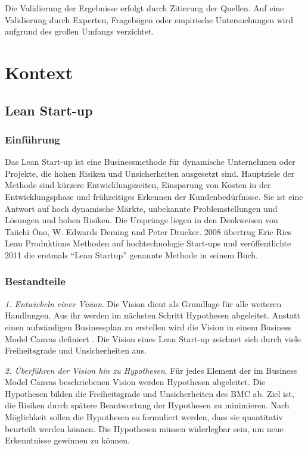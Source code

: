 Die Validierung der Ergebnisse erfolgt durch Zitierung der Quellen. Auf eine Validierung durch Experten, Fragebögen oder empirische Untersuchungen wird aufgrund des großen Umfangs verzichtet. 

\section{Kontext}

\subsection{Lean Start-up}
\subsubsection*{Einführung}
Das Lean Start-up ist eine Businessmethode für dynamische Unternehmen oder Projekte, die hohen Risiken und Unsicherheiten ausgesetzt sind. 
Hauptziele der Methode sind kürzere Entwicklungszeiten, Einsparung von Kosten in der Entwicklungsphase und frühzeitiges Erkennen der Kundenbedürfnisse. 
Sie ist eine Antwort auf hoch dynamische Märkte, unbekannte Problemstellungen und Lösungen und hohen Risiken. Die Ursprünge liegen in den Denkweisen von Taiichi Ōno, W. Edwards Deming und Peter Drucker. 
2008 übertrug Eric Ries Lean Produktions Methoden auf hochtechnologie Start-ups und veröffentlichte 2011 die erstmals ``Lean Startup'' 
genannte Methode in seinem Buch. %


\subsubsection*{Bestandteile}

\textit{1. Entwickeln einer Vision}. Die Vision dient als Grundlage für alle weiteren Handlungen. Aus ihr werden im nächsten Schritt Hypothesen abgeleitet. Anstatt einen aufwändigen Businessplan zu erstellen wird die Vision in einem Business Model Canvas definiert \cite{Blank2013}. Die Vision eines Lean Start-up zeichnet sich durch viele Freiheitsgrade und Unsicherheiten aus. 

\textit{2. Überführen der Vision hin zu Hypothesen}. Für jedes Element der im Business Model Canvas beschriebenen Vision werden Hypothesen abgeleitet. Die Hypothesen bilden die Freiheitsgrade und Unsicherheiten des BMC ab. Ziel ist, die Risiken durch spätere Beantwortung der Hypothesen zu minimieren. Nach Möglichkeit sollen die Hypothesen so formuliert werden, dass sie quantitativ beurteilt werden können. Die Hypothesen müssen widerlegbar sein, um neue Erkenntnisse gewinnen zu können. 

